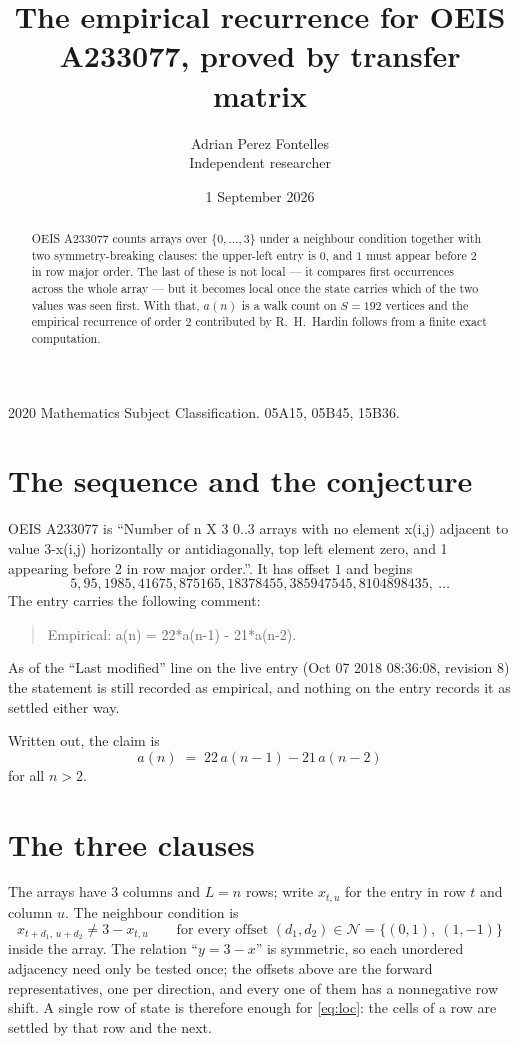 \documentclass[11pt,a4paper]{article}
\title{The empirical recurrence for OEIS A233077, proved by transfer matrix}
\author{Adrian Perez Fontelles\\ \small Independent researcher}
\date{1 September 2026}
\theoremstyle{plain}
\theoremstyle{definition}
\begin{document}
\maketitle

\begin{abstract}
OEIS A233077 counts arrays over $\{0,\dots,3\}$ under a neighbour condition together with
two symmetry-breaking clauses: the upper-left entry is $0$, and $1$ must appear before
$2$ in row major order. The last of these is not local --- it compares first occurrences
across the whole array --- but it becomes local once the state carries which of the two values
was seen first. With that, $a(n)$ is a walk count on $S=192$ vertices and the empirical
recurrence of order $2$ contributed by R.~H.~Hardin follows from a finite exact
computation.
\end{abstract}

\noindent\small 2020 Mathematics Subject Classification. 05A15, 05B45, 15B36.\normalsize

\section{The sequence and the conjecture}

OEIS A233077 is ``Number of n X 3 0..3 arrays with no element x(i,j) adjacent to value 3-x(i,j) horizontally or antidiagonally, top left element zero, and 1 appearing before 2 in row major order.''. It has offset $1$ and begins
\[
5, 95, 1985, 41675, 875165, 18378455, 385947545, 8104898435,\ \dots
\]
The entry carries the following comment:
\begin{quote}\small
Empirical: a(n) = 22*a(n-1) - 21*a(n-2).
\end{quote}
As of the ``Last modified'' line on the live entry (Oct 07 2018 08:36:08, revision 8) the statement is
still recorded as empirical, and nothing on the entry records it as settled either way.

Written out, the claim is
\begin{equation}\label{eq:conj}
a(n)\;=\;22\,a(n-1) - 21\,a(n-2)
\end{equation}
for all $n>2$.

\section{The three clauses}

The arrays have $3$ columns and $L=n$ rows; write $x_{t,u}$ for the entry in
row $t$ and column $u$. The neighbour condition is
\begin{equation}\label{eq:loc}
x_{t+d_1,\,u+d_2}\ne 3-x_{t,u}\qquad\text{for every offset }(d_1,d_2)\in\mathcal N=\{(0,1),\ (1,-1)\}
\end{equation}
inside the array. The relation ``$y=3-x$'' is symmetric, so each unordered adjacency need
only be tested once; the offsets above are the forward representatives, one per direction,
and every one of them has a nonnegative row shift. A single row of state is therefore
enough for \eqref{eq:loc}: the cells of a row are settled by that row and the next.
\end{document}
